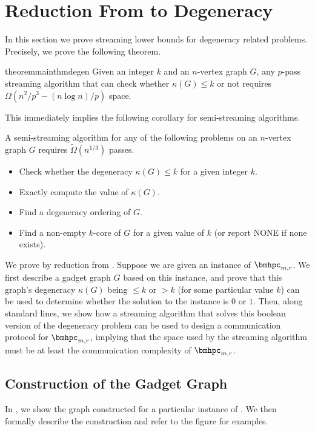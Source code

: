 \section{Reduction From \bmhpc to Degeneracy}\label{sec:reduction}

In this section we prove streaming lower bounds for degeneracy related problems. Precisely, we prove the following theorem. 
\begin{restatable}{theorem}{mainthmdegen}
\label{thm:degen-lb}
Given an integer $k$ and an $n$-vertex graph $G$, any $p$-pass streaming algorithm that can check whether $\kappa(G)\leq k$ or not requires $\Omega(n^2/p^3- (n\log n)/p)$ space.   \end{restatable}

This immediately implies the following corollary for semi-streaming algorithms.

\begin{corollary}
A semi-streaming algorithm for any of the following problems on an $n$-vertex graph $G$ requires $\tilde{\Omega}(n^{1/3})$ passes.
\begin{itemize}
    \item Check whether the degeneracy $\kappa(G)\leq k$ for a given integer $k$.
    \item Exactly compute the value of  $\kappa(G)$.
    \item Find a degeneracy ordering of $G$.
    \item Find a non-empty $k$-core of $G$ for a given value of $k$ (or report NONE if none exists).
\end{itemize}
 \end{corollary}


We prove  by reduction from \bmhpc. Suppose we are given an instance of $\bmhpc_{m,r}$. We first describe a gadget graph $G$ based on this instance, and prove that this graph's degeneracy $\kappa(G)$ being $\leq k$ or $>k$ (for some particular value $k$) can be used to determine whether the solution to the \bmhpc instance is $0$ or $1$. Then, along standard lines, we show how a streaming algorithm that solves this boolean version of the  degeneracy problem can be used to design a communication protocol for $\bmhpc_{m,r}$, implying that the space used by the streaming algorithm must be at least the communication complexity of $\bmhpc_{m,r}$. 

\subsection{Construction of the Gadget Graph}\label{sec:redn-graph}
 In , we show the graph constructed for a particular instance of \bmhpc. We then formally describe the construction and refer to the figure for examples. 
 
